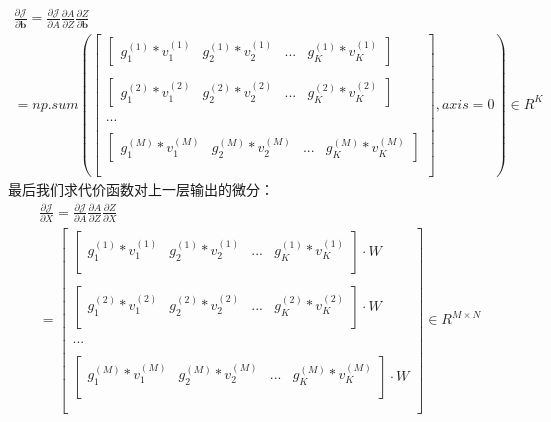 \documentclass[UTF8]{article}
\begin{document}
\begin{equation}
\begin{aligned}
\frac{\partial{\mathcal{J}}}{\partial{\boldsymbol{b}}}=\frac{\partial{\mathcal{J}}}{\partial{A}} \frac{\partial{A}}{\partial{Z}} \frac{\partial{Z}}{\partial{\boldsymbol{b}}} \\
 =np.sum(
 \begin{bmatrix}
\begin{bmatrix}
 g_{1}^{(1)}*v_{1}^{(1)} & g_{2}^{(1)}*v_{2}^{(1)} & ... & g_{K}^{(1)}*v_{K}^{(1)}
 \end{bmatrix} \\ \\
\begin{bmatrix}
 g_{1}^{(2)}*v_{1}^{(2)} & g_{2}^{(2)}*v_{2}^{(2)} & ... & g_{K}^{(2)}*v_{K}^{(2)}
 \end{bmatrix} \\ \\
 ... \\ \\
 \begin{bmatrix}
 g_{1}^{(M)}*v_{1}^{(M)} & g_{2}^{(M)}*v_{2}^{(M)} & ... & g_{K}^{(M)}*v_{K}^{(M)}
 \end{bmatrix} \\ \\
\end{bmatrix}, axis=0) \in R^{K}
\end{aligned}
\label{mlp-leaky-relu-pJ-pb-def}
\end{equation}
最后我们求代价函数对上一层输出的微分：
\begin{equation}
\begin{aligned}
\frac{\partial{\mathcal{J}}}{\partial{X}}=\frac{\partial{\mathcal{J}}}{\partial{A}} \frac{\partial{A}}{\partial{Z}} \frac{\partial{Z}}{\partial{X}} \\
 =\begin{bmatrix}
 \begin{bmatrix}
 g_{1}^{(1)}*v_{1}^{(1)} & g_{2}^{(1)}*v_{2}^{(1)} & ... & g_{K}^{(1)}*v_{K}^{(1)} \\
 \end{bmatrix} \cdot W \\ \\
 \begin{bmatrix}
 g_{1}^{(2)}*v_{1}^{(2)} & g_{2}^{(2)}*v_{2}^{(2)} & ... & g_{K}^{(2)}*v_{K}^{(2)} \\
 \end{bmatrix} \cdot W \\ \\
 ... \\ \\
 \begin{bmatrix}
 g_{1}^{(M)}*v_{1}^{(M)} & g_{2}^{(M)}*v_{2}^{(M)} & ... & g_{K}^{(M)}*v_{K}^{(M)} \\
 \end{bmatrix} \cdot W \\ \\
 \end{bmatrix} \in R^{M \times N}
\end{aligned}
\label{mlp-leaky-relu-pJ-pX-def}
\end{equation}
\end{document}
